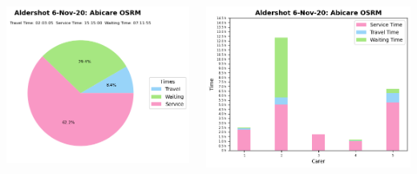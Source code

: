 \documentclass[usenames,dvipsnames]{beamer}
\begin{document}
\begin{frame} %
	\begin{columns}
		\begin{minipage}[c][0.45\textheight][c]{\linewidth}
			\centering
			\includegraphics[width=1\linewidth]{figures/6_Nov_20_Aldershot_time_info_abiosrm}
		\end{minipage}
		\begin{minipage}[c][0.45\textheight][c]{\linewidth}
			\vspace{5mm}
			\centering
			\includegraphics[width=1\linewidth]{figures/6_Nov_20_Aldershot_workload_abiosrm}

\end{minipage}
\end{columns}
\end{frame}
\end{document}
